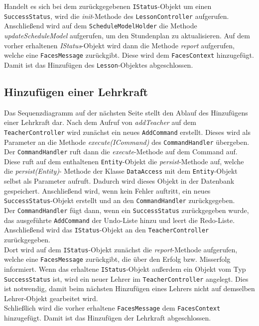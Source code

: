 \documentclass[fontsize=12pt,paper=a4,twoside]{scrartcl}
\begin{document}
Handelt es sich bei dem zurückgegebenen \texttt{IStatus}-Objekt um einen \texttt{SuccessStatus}, wird die \textit{init}-Methode des \texttt{LessonController} aufgerufen.\\
Anschließend wird auf dem \texttt{ScheduleModelHolder} die Methode \textit{updateScheduleModel} aufgerufen, um den Stundenplan zu aktualisieren. Auf dem vorher erhaltenen \textit{IStatus}-Objekt wird dann die Methode \textit{report} aufgerufen, welche eine \texttt{FacesMessage} zurückgibt. Diese wird dem \texttt{FacesContext} hinzugefügt. \\
Damit ist das Hinzufügen des \texttt{Lesson}-Objektes abgeschlossen.




\subsection{Hinzufügen einer Lehrkraft}
Das Sequenzdiagramm auf der nächsten Seite stellt den Ablauf des Hinzufügens einer Lehrkraft dar. Nach dem Aufruf von \textit{addTeacher} auf dem \texttt{TeacherController} wird zunächst ein neues \texttt{AddCommand} erstellt. Dieses wird als Parameter an die Methode \textit{execute(ICommand)} des \texttt{CommandHandler} übergeben. Der \texttt{CommandHandler} ruft dann die \textit{execute}-Methode auf dem Command auf. Diese ruft auf dem  enthaltenen \texttt{Entity}-Objekt die \textit{persist}-Methode auf, welche die \textit{persist(Entity)}- Methode der Klasse \texttt{DataAccess} mit dem \texttt{Entity}-Objekt selbst als Parameter aufruft. Dadurch wird dieses Objekt in der Datenbank gespeichert. Anschließend wird, wenn kein Fehler auftritt, ein neues \texttt{SuccessStatus}-Objekt erstellt und an den \texttt{CommandHandler} zurückgegeben.\\
Der \texttt{CommandHandler} fügt dann, wenn ein \texttt{SuccessStatus} zurückgegeben wurde, das ausgeführte \texttt{AddCommand} der Undo-Liste hinzu und leert die Redo-Liste. Anschließend wird das \texttt{IStatus}-Objekt an den \texttt{TeacherController} zurückgegeben.\\
Dort wird auf dem \texttt{IStatus}-Objekt zunächst die \textit{report}-Methode aufgerufen, welche eine \texttt{FacesMessage} zurückgibt, die über den Erfolg bzw. Misserfolg informiert. Wenn das erhaltene \texttt{IStatus}-Objekt außerdem ein Objekt vom Typ \texttt{SuccessStatus} ist, wird ein neuer Lehrer im \texttt{TeacherController} angelegt. Dies ist notwendig, damit beim nächsten Hinzufügen eines Lehrers nicht auf demselben Lehrer-Objekt gearbeitet wird.\\
Schließlich wird die vorher erhaltene \texttt{FacesMessage} dem \texttt{FacesContext} hinzugefügt. Damit ist das Hinzufügen der Lehrkraft abgeschlossen.
\end{document}
